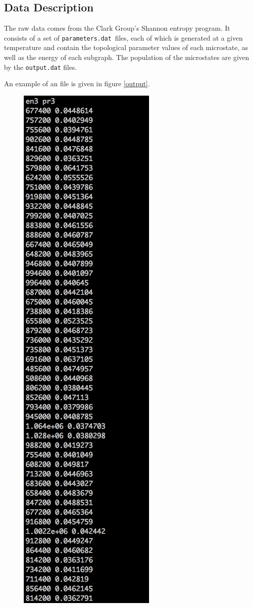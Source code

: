 \documentclass[paper=a4, fontsize=12pt]{article}
\begin{document}
\subsection*{Data Description}

\vspace{1em}

\noindent The raw data comes from the Clark Group's Shannon entropy program.
It consists of a set of \texttt{parameters.dat}\ files,
each of which is generated at a given temperature
and contain the topological parameter values of each microstate,
as well as the energy of each subgraph.
The population of the microstates are given by the \texttt{output.dat} files.

An example of an  file is given in figure \ref{output}.

\begin{figure}
  \centering
  \includegraphics[height=0.95\textheight]{output_file}

\end{figure}
\end{document}
